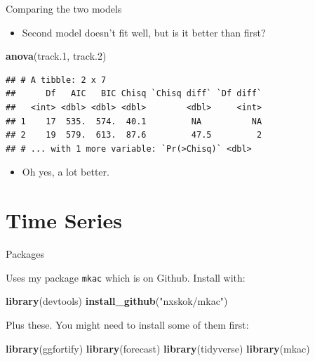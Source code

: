 \documentclass[
  ignorenonframetext,
]{beamer}
\newenvironment{Shaded}{\begin{snugshade}}{\end{snugshade}}
\newcommand{\FloatTok}[1]{\textcolor[rgb]{0.00,0.00,0.81}{#1}}
\newcommand{\KeywordTok}[1]{\textcolor[rgb]{0.13,0.29,0.53}{\textbf{#1}}}
\newcommand{\NormalTok}[1]{#1}
\newcommand{\StringTok}[1]{\textcolor[rgb]{0.31,0.60,0.02}{#1}}
\providecommand{\tightlist}{%
  \setlength{\itemsep}{0pt}\setlength{\parskip}{0pt}}
\begin{document}
\begin{frame}[fragile]{Comparing the two models}
\protect\hypertarget{comparing-the-two-models}{}

\begin{itemize}
\tightlist
\item
  Second model doesn't fit well, but is it better than first?
\end{itemize}

\footnotesize

\begin{Shaded}
\begin{Highlighting}[]
\KeywordTok{anova}\NormalTok{(track}\FloatTok{.1}\NormalTok{, track}\FloatTok{.2}\NormalTok{)}
\end{Highlighting}
\end{Shaded}

\begin{verbatim}
## # A tibble: 2 x 7
##      Df   AIC   BIC Chisq `Chisq diff` `Df diff`
##   <int> <dbl> <dbl> <dbl>        <dbl>     <int>
## 1    17  535.  574.  40.1         NA          NA
## 2    19  579.  613.  87.6         47.5         2
## # ... with 1 more variable: `Pr(>Chisq)` <dbl>
\end{verbatim}

\normalsize

\begin{itemize}
\tightlist
\item
  Oh yes, a lot better.
\end{itemize}

\end{frame}

\hypertarget{time-series}{%
\section{Time Series}\label{time-series}}

\begin{frame}[fragile]{Packages}
\protect\hypertarget{packages-10}{}

Uses my package \texttt{mkac} which is on Github. Install with:

\begin{Shaded}
\begin{Highlighting}[]
\KeywordTok{library}\NormalTok{(devtools)}
\KeywordTok{install_github}\NormalTok{(}\StringTok{"nxskok/mkac"}\NormalTok{)}
\end{Highlighting}
\end{Shaded}

Plus these. You might need to install some of them first:

\begin{Shaded}
\begin{Highlighting}[]
\KeywordTok{library}\NormalTok{(ggfortify)}
\KeywordTok{library}\NormalTok{(forecast)}
\KeywordTok{library}\NormalTok{(tidyverse)}
\KeywordTok{library}\NormalTok{(mkac) }
\end{Highlighting}
\end{Shaded}

\end{frame}
\end{document}
